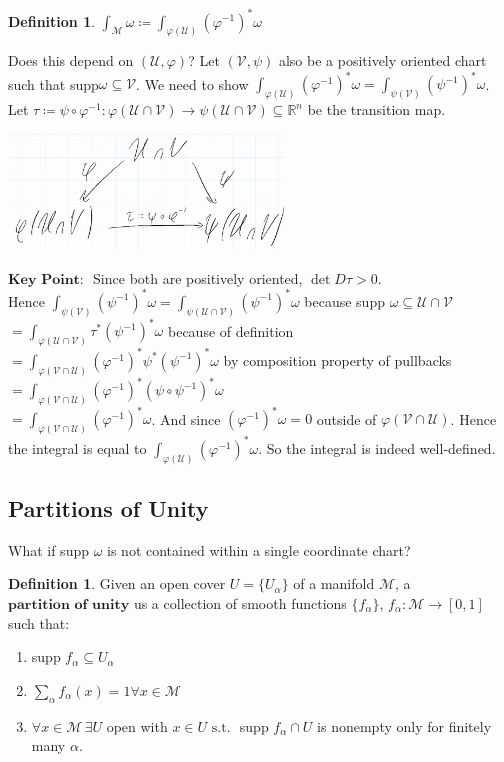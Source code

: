\documentclass[10pt]{article}
\theoremstyle{plain}
\theoremstyle{definition}
\newtheorem{defn}[thm]{Definition} %
\newcommand{\st}{\text{ s.t. }}
\newcommand{\KeyPoint}{\textbf{Key Point: }}
\newcommand{\Real}{\mathbb{R}}
\newcommand{\man}{\mathcal{M}}
\newcommand{\chartU}{\mathcal{U}}
\newcommand{\chartV}{\mathcal{V}}
\newcommand{\chart}{\varphi}
\newcommand{\xman}{x\in\man}
\newcommand{\sumfromto}[2]{\sum\limits_{#1}^{#2}}
\newcommand{\mysubsection}[1]{
    \subsection{#1}
}
\begin{document}
\begin{defn}
$\int_\man \omega \coloneqq \int_{\chart(\chartU)} (\chart^{-1})^*\omega$
\end{defn}
Does this depend on $(\chartU,\chart)$? Let $(\chartV,\psi)$ also be a positively oriented chart such that supp$\omega \subseteq \chartV$. We need to show $ \int_{\chart(\chartU)} (\chart^{-1})^*\omega =  \int_{\psi(\chartV)} (\psi^{-1})^*\omega$. Let $\tau \coloneqq \psi \circ \varphi ^{-1} : \chart(\chartU\cap \chartV) \to \psi(\chartU\cap\chartV) \subseteq \Real^n$ be the transition map.
\begin{center}\includegraphics[width=0.55\textwidth]{integrationofcharts.png}\end{center}
$\KeyPoint$ Since both are positively oriented, $\det D\tau > 0$.\\
Hence $\int_{\psi(\chartV)} (\psi^{-1})^*\omega = \int_{\psi(\chartU \cap\chartV)} (\psi^{-1})^*\omega$ because supp $\omega \subseteq\chartU\cap\chartV$\\
$ = \int_{\chart(\chartU \cap\chartV)} \tau^*(\psi^{-1})^*\omega$ because of definition\\
$= \int_{\chart(\chartV\cap\chartU)} (\chart^{-1})^*\psi^*(\psi^{-1})^*\omega$ by composition property of pullbacks\\
$= \int_{\chart(\chartV \cap\chartU)} (\chart^{-1})^*(\psi\circ\psi^{-1})^*\omega$\\
$=\int_{\chart(\chartV \cap\chartU)} (\chart^{-1})^*\omega$. And since $(\chart^{-1})^*\omega =0 $ outside of $\chart(\chartV\cap\chartU)$. Hence the integral is equal to $\int_{\chart(\chartU)}(\chart^{-1})^*\omega.$ So the integral is indeed well-defined.
 \mysubsection{Partitions of Unity}
 What if supp $\omega$ is not contained within a single coordinate chart? 
 \begin{defn}
 Given an open cover $U = \{U_\alpha\}$ of a manifold $\man$, a $\textbf{partition of unity}$ us a collection of smooth functions $\{f_\alpha\}$, $f_\alpha : \man \to [0,1]$ such that:
 \begin{enumerate}
     \item supp $f_\alpha \subseteq U_\alpha$
     \item $\sumfromto{\alpha}{}f_\alpha(x) = 1 \forall \xman$
     \item $\forall\xman\, \exists U$ open with $x\in U \st $ supp $f_\alpha \cap U$ is nonempty only for finitely many $\alpha$.
 \end{enumerate}
 \end{defn}
\end{document}
